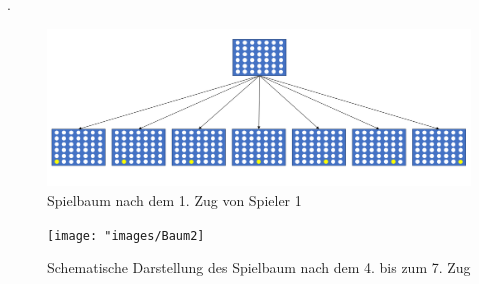 .
\begin{figure}[H]
	\centering
	\includegraphics[width=0.9\linewidth]{"images/Baum1"}
	\caption[Spielbaum nach der 2. Tiefe]{Spielbaum nach dem 1. Zug von Spieler 1}
	\label{fig:baum1}
\end{figure}

\begin{figure}[H]
	\centering
	\texttt{[image: "images/Baum2]}
	\caption[Spielbaum nach dem 4. Zug. Quelle: \cite{vandewiele2017}]{Schematische Darstellung des Spielbaum nach dem 4. bis zum 7. Zug}
	\label{fig:Baum2}
\end{figure}



